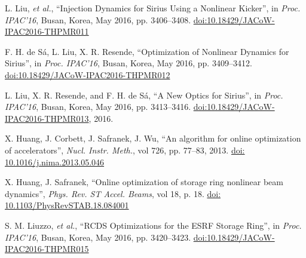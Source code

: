 \documentclass[a4paper,
               keeplastbox,   %
               ]{jacow}
\begin{document}
	\begin{thebibliography}{9} %
	
        

        L. Liu, \emph{et al.},
       \textquotedblleft{{I}njection {D}ynamics for {S}irius {U}sing a {N}onlinear {K}icker}\textquotedblright,
       in \emph{Proc. IPAC’16}, Busan, Korea, May 2016, pp. 3406--3408.
       \url{doi:10.18429/JACoW-IPAC2016-THPMR011} 
 
        F. H. de Sá, L. Liu, X. R. Resende,
       \textquotedblleft{{O}ptimization of {N}onlinear {D}ynamics for {S}irius}\textquotedblright,
       in \emph{Proc. IPAC’16}, Busan, Korea, May 2016, pp. 3409--3412.
       \url{doi:10.18429/JACoW-IPAC2016-THPMR012}

       L. Liu, X. R. Resende, and F. H. de Sá,
       \textquotedblleft{A New Optics for Sirius}\textquotedblright,
     in \emph{Proc. IPAC'16}, Busan, Korea, May 2016, pp. 3413--3416.
       \url{doi:10.18429/JACoW-IPAC2016-THPMR013}, 2016.
           
		X. Huang, J. Corbett, J. Safranek, J. Wu,
		\textquotedblleft{An algorithm for online optimization of accelerators}\textquotedblright,
		\emph{Nucl.  Instr. Meth.}, vol 726, pp. 77--83, 2013.
        \url{doi: 10.1016/j.nima.2013.05.046}

		X. Huang, J. Safranek,
		\textquotedblleft{Online optimization of storage ring nonlinear beam dynamics}\textquotedblright,
		\emph{Phys. Rev. ST Accel. Beams}, vol 18, p. 18.
        \url{doi: 10.1103/PhysRevSTAB.18.084001} 
 
        S. M. Liuzzo, \emph{et al.},
        \textquotedblleft{RCDS Optimizations for the ESRF Storage Ring}\textquotedblright,
        in \emph{Proc. IPAC’16}, Busan, Korea, May 2016, pp. 3420--3423.
       \url{doi:10.18429/JACoW-IPAC2016-THPMR015}   
    

\end{thebibliography}
\end{document}

